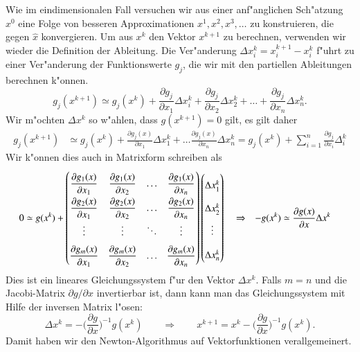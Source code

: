 Wie im eindimensionalen Fall versuchen wir aus einer anf"anglichen
Sch"atzung $x^{0}$ eine Folge von besseren Approximationen $x^1,
x^2,x^3,\dots$ zu konstruieren, die gegen $\hat{x}$ konvergieren.
Um aus $x^k$ den Vektor $x^{k+1}$ zu berechnen, verwenden wir wieder
die Definition der Ableitung.
Die Ver"anderung $\Delta x_i^k=x_i^{k+1}-x_i^k$ f"uhrt zu einer Ver"anderung
der Funktionswerte $g_j$, die wir mit den partiellen Ableitungen berechnen
k"onnen. 
\[
g_j(x^{k+1})
\simeq
g_j(x^k)
+ \frac{\partial g_j}{\partial x_1}\Delta x_i^k
+ \frac{\partial g_j}{\partial x_2}\Delta x_2^k
+ \dots 
+ \frac{\partial g_j}{\partial x_n}\Delta x_n^k.
\]
Wir m"ochten $\Delta x^k$ so w"ahlen, dass $g(x^{k+1})=0$ gilt,
es gilt daher
\begin{align*}
g_j(x^{k+1})
&\simeq
	g_j(x^k) + \frac{\partial g_j(x)}{\partial x_1}\Delta x_1^k + \dots
		\frac{\partial g_j(x)}{\partial x_n}\Delta x_n^k
	=g_j(x^k)+\sum_{i=1}^n\frac{\partial g_j}{\partial x_i}\Delta_i^k
\end{align*}
Wir k"onnen dies auch in Matrixform schreiben als
\begin{align*}
0&\simeq g(x^k) +
{\def\arraystretch{2}
\begin{pmatrix}
\displaystyle\frac{\partial g_1(x)}{\partial x_1}
	&\displaystyle\frac{\partial g_1(x)}{\partial x_2}
		&\dots
			&\displaystyle\frac{\partial g_1(x)}{\partial x_n}\\
\displaystyle\frac{\partial g_2(x)}{\partial x_1}
	&\displaystyle\frac{\partial g_2(x)}{\partial x_2}
		&\dots
			&\displaystyle\frac{\partial g_2(x)}{\partial x_n}\\
\vdots
	&\vdots
		&\ddots
			&\vdots\\
\displaystyle\frac{\partial g_m(x)}{\partial x_1}
	&\displaystyle\frac{\partial g_m(x)}{\partial x_2}
		&\dots
			&\displaystyle\frac{\partial g_m(x)}{\partial x_n}
\end{pmatrix}}
\begin{pmatrix}
\Delta x_1^k\\
\Delta x_2^k\\
\vdots\\
\Delta x_n^k
\end{pmatrix}
&&\Rightarrow&
-g(x^k)
&\simeq
\frac{\partial g(x)}{\partial x}\Delta x^k
\end{align*}
Dies ist ein lineares Gleichungssystem f"ur den Vektor $\Delta x^k$.
Falls $m=n$ und die Jacobi-Matrix $\partial g/\partial x$ invertierbar ist,
dann kann
%
man das Gleichungssystem mit Hilfe der inversen Matrix l"osen:
\[
\Delta x^k =
-\biggl(\frac{\partial g}{\partial x}\biggr)^{-1} g(x^k)
\qquad
\Rightarrow
\qquad
x^{k+1}=x^k  -\biggl(\frac{\partial g}{\partial x}\biggr)^{-1} g(x^k).
\]
Damit haben wir den Newton-Algorithmus auf Vektorfunktionen verallgemeinert.

